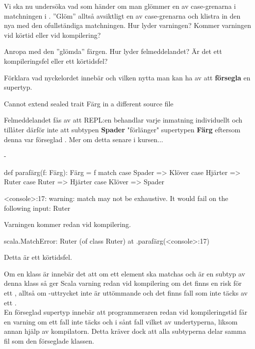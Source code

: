 \Subtask Vi ska nu undersöka vad som händer om man glömmer en av case-grenarna i matchningen i . ''Glöm'' alltså avsiktligt en av case-grenarna och klistra in den nya  med den ofullständiga matchningen. Hur lyder varningen? Kommer varningen vid körtid eller vid kompilering?

\Subtask Anropa  med den ''glömda'' färgen. Hur lyder felmeddelandet? Är det ett kompileringsfel eller ett körtidsfel?

\Subtask Förklara vad nyckelordet  innebär och vilken nytta man kan ha av att \textbf{försegla} en supertyp.


\SOLUTION


\TaskSolved \what

\SubtaskSolved
\begin{REPL}
Cannot extend sealed trait Färg in a different source file
\end{REPL}
Felmeddelandet fås av att REPL:en behandlar varje inmatning individuellt och tillåter därför inte att subtypen \textbf{Spader} "förlänger"  supertypen \textbf{Färg} eftersom denna var förseglad . Mer om detta senare i kursen...

\SubtaskSolved
-

\SubtaskSolved
\begin{Code}
def parafärg(f: Färg): Färg = f match
  case Spader  => Klöver
  case Hjärter => Ruter
  case Ruter   => Hjärter
  case Klöver  => Spader
\end{Code}

\SubtaskSolved
\begin{REPL}
<console>:17: warning: match may not be exhaustive.
It would fail on the following input: Ruter
\end{REPL}
Varningen kommer redan vid kompilering.

\SubtaskSolved
\begin{REPL}
scala.MatchError: Ruter (of class Ruter)
  at .parafärg(<console>:17)
\end{REPL}
Detta är ett körtidsfel.

\SubtaskSolved  Om en klass är  innebär det att om ett element ska matchas och är en subtyp av denna klass så ger Scala varning redan vid kompilering om det finns en risk för ett , alltså om -uttrycket inte är uttömmande och det finns fall som inte täcks av ett .\\
En förseglad supertyp innebär att programmeraren redan vid kompileringstid får en varning om ett fall inte täcks och i sånt fall vilket av undertyperna, liksom annan hjälp av kompilatorn. Detta kräver dock att alla subtyperna delar samma fil som den förseglade klassen.




